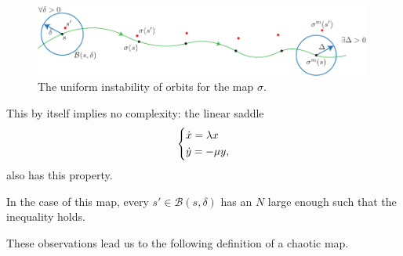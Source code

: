 \begin{figure}[h!]
	\centering
	\includegraphics[width=0.99\textwidth]{figures/ch6/22unif_instab.pdf}
	\caption{The uniform instability of orbits for the map $\sigma$.}
	\label{fig:unif_instab}
\end{figure}

\begin{remark}[]
	This by itself implies no complexity: the linear saddle
	\begin{align}
		\begin{dcases}
			\dot{x} = \lambda x \\
			\dot{y} = - \mu y,
		\end{dcases}
	\end{align}
also has this property.	
\end{remark}

\begin{remark}[]
	In the case of this map, every $s'\in \mathcal{B}\left(s, \delta \right)$ has an $N$ large enough such that the inequality holds.
\end{remark}

These observations lead us to the following definition of a chaotic map.


